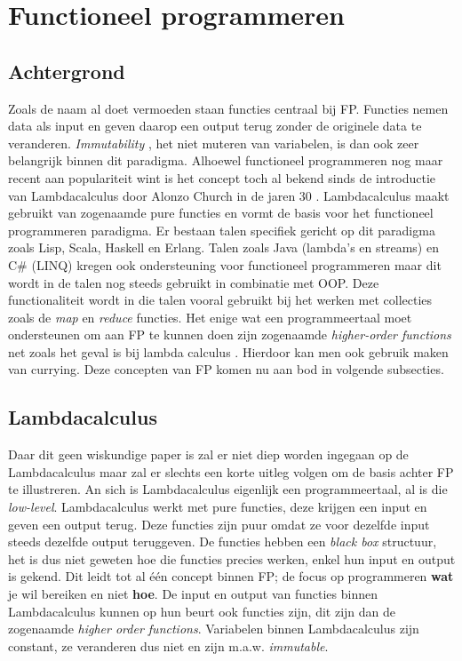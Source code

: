 \section{Functioneel programmeren}
\subsection{Achtergrond}
Zoals de naam al doet vermoeden staan functies centraal bij FP. Functies nemen data als input en geven daarop een output terug zonder de originele data te veranderen. \textit{Immutability} \autocite{Goetz2006}, het niet muteren van variabelen, is dan ook zeer belangrijk binnen dit paradigma. Alhoewel functioneel programmeren nog maar recent aan populariteit wint is het concept toch al bekend sinds de introductie van Lambdacalculus door Alonzo Church in de jaren 30 \autocite{Church1941}. Lambdacalculus maakt gebruikt van zogenaamde pure functies en vormt de basis voor het functioneel programmeren paradigma. Er bestaan talen specifiek gericht op dit paradigma zoals Lisp, Scala, Haskell en Erlang. Talen zoals Java (lambda's en streams) en C\# (LINQ) kregen ook ondersteuning voor functioneel programmeren maar dit wordt in de talen nog steeds gebruikt in combinatie met OOP. Deze functionaliteit wordt in die talen vooral gebruikt bij het werken met collecties zoals de \textit{map} en \textit{reduce} functies. Het enige wat een programmeertaal moet ondersteunen om aan FP te kunnen doen zijn zogenaamde \textit{higher-order functions} net zoals het geval is bij lambda calculus \autocite{Federale2019}. Hierdoor kan men ook gebruik maken van currying. Deze concepten van FP komen nu aan bod in volgende subsecties.

\subsection{Lambdacalculus}
Daar dit geen wiskundige paper is zal er niet diep worden ingegaan op de Lambdacalculus maar zal er slechts een korte uitleg volgen om de basis achter FP te illustreren. An sich is Lambdacalculus eigenlijk een programmeertaal, al is die \textit{low-level}. Lambdacalculus werkt met pure functies, deze krijgen een input en geven een output terug. Deze functies zijn puur omdat ze voor dezelfde input steeds dezelfde output teruggeven. De functies hebben een \textit{black box} structuur, het is dus niet geweten hoe die functies precies werken, enkel hun input en output is gekend. Dit leidt tot al één concept binnen FP; de focus op programmeren \textbf{wat} je wil bereiken en niet \textbf{hoe}. De input en output van functies binnen Lambdacalculus kunnen op hun beurt ook functies zijn, dit zijn dan de zogenaamde \textit{higher order functions}. Variabelen binnen Lambdacalculus zijn constant, ze veranderen dus niet en zijn m.a.w. \textit{immutable}.

